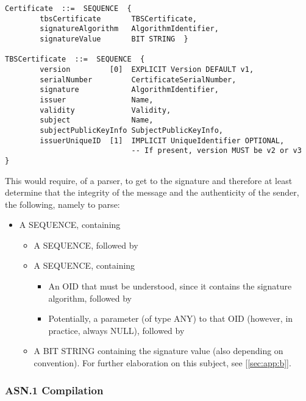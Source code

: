 \label{ref:tbscert}

\begin{changemargin}{-60mm}{0mm}
\begin{myquote}
\begin{verbatim}
Certificate  ::=  SEQUENCE  {
        tbsCertificate       TBSCertificate,
        signatureAlgorithm   AlgorithmIdentifier,
        signatureValue       BIT STRING  }

TBSCertificate  ::=  SEQUENCE  {
        version         [0]  EXPLICIT Version DEFAULT v1,
        serialNumber         CertificateSerialNumber,
        signature            AlgorithmIdentifier,
        issuer               Name,
        validity             Validity,
        subject              Name,
        subjectPublicKeyInfo SubjectPublicKeyInfo,
        issuerUniqueID  [1]  IMPLICIT UniqueIdentifier OPTIONAL,
                             -- If present, version MUST be v2 or v3
}
\end{verbatim}
\end{myquote}
\end{changemargin}

This would require, of a parser, to get to the signature and therefore at 
least determine that the integrity of the message and the authenticity of 
the sender, the following, namely to parse:
\begin{itemize}
    \item A SEQUENCE, containing
    \begin{itemize}
        \item A SEQUENCE, followed by
        \item A SEQUENCE, containing
        \begin{itemize}
            \item An OID that must be understood, since it contains the 
signature algorithm, followed by
            \item Potentially, a parameter (of type ANY) to that OID 
(however, in practice, always NULL), followed by
        \end{itemize}
        \item A BIT STRING containing the signature value (also depending on 
convention).
For further elaboration on this subject, see [\ref{sec:app:b}].
    \end{itemize}
\end{itemize}

\subsubsection{ASN.1 Compilation}

